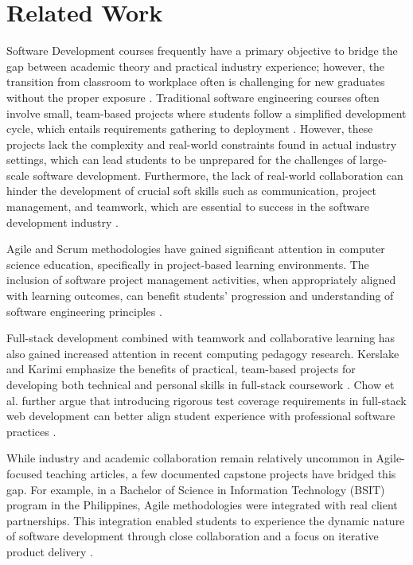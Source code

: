 \documentclass{article}
\begin{document}
\section{Related Work}
Software Development courses frequently have a primary objective to bridge the gap between academic theory and practical industry experience; however, the transition from classroom to workplace often is challenging for new graduates without the proper exposure \cite{cleland2013evaluating}. Traditional software engineering courses often involve small, team-based projects where students follow a simplified development cycle, which entails requirements gathering to deployment \cite{begel2008struggles, way2005framework}. However, these projects lack the complexity and real-world constraints found in actual industry settings, which can lead students to be unprepared for the challenges of large-scale software development. Furthermore, the lack of real-world collaboration can hinder the development of crucial soft skills such as communication, project management, and teamwork, which are essential to success in the software development industry \cite{radermacher2014skillgap}.

Agile and Scrum methodologies have gained significant attention in computer science education, specifically in project-based learning environments. The inclusion of software project management activities, when appropriately aligned with learning outcomes, can benefit students’ progression and understanding of software engineering principles \cite{gonzalez2020experiential}.

Full-stack development combined with teamwork and collaborative learning has also gained increased attention in recent computing pedagogy research. Kerslake and Karimi emphasize the benefits of practical, team-based projects for developing both technical and personal skills in full-stack coursework \cite{kerslake2021web}. Chow et al. further argue that introducing rigorous test coverage requirements in full-stack web development can better align student experience with professional software practices \cite{chow2021testing}.

While industry and academic collaboration remain relatively uncommon in Agile-focused teaching articles, a few documented capstone projects have bridged this gap. For example, in a Bachelor of Science in Information Technology (BSIT) program in the Philippines, Agile methodologies were integrated with real client partnerships. This integration enabled students to experience the dynamic nature of software development through close collaboration and a focus on iterative product delivery \cite{ng2020agile}.
\end{document}
